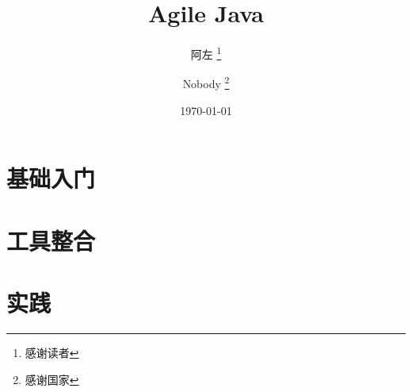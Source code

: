 \documentclass[10pt,a4paper]{report}
\title{Agile Java}                             %
\author{                                     %
		阿左 \thanks{感谢读者} \and 
		Nobody \thanks{感谢国家}
	}
\date{\today}                                %
\begin{document}
	\maketitle                                   %
	\tableofcontents                             %
	\setcounter{tocdepth}{5}                     %
	\listoffigures                               %
	\listoftables                                %



	\part{基础入门}

		

		

		

	\part{工具整合}

	\part{实践}
\end{document}
